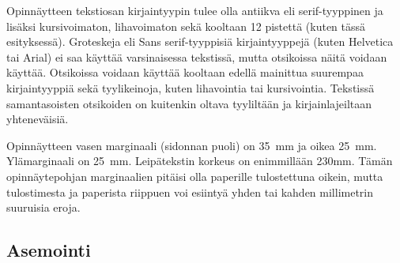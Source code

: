 \documentclass[english,12pt,a4paper,pdftex,sci,utf8]{aaltothesis}
\begin{document}
Opinn\"aytteen tekstiosan kirjaintyypin tulee olla antiikva eli
serif\--tyyp\-pi\-nen ja lis\"aksi kursivoimaton, lihavoimaton sek\"a kooltaan 12
pistett\"a (kuten t\"ass\"a esityksess\"a). Groteskeja eli \textsf{Sans
  serif}-tyyppisi\"a kirjaintyyppej\"a (kuten Helvetica tai Arial) ei saa
k\"aytt\"a\"a varsinaisessa tekstiss\"a, mutta otsikoissa n\"ait\"a voidaan
k\"aytt\"a\"a.  Otsikoissa voidaan k\"aytt\"a\"a kooltaan edell\"a mainittua
suurempaa kirjaintyyppi\"a sek\"a tyylikeinoja, kuten lihavointia tai
kursivointia.  Tekstiss\"a samantasoisten otsikoiden on kuitenkin oltava
tyylilt\"a\"an ja kirjainlajeiltaan yhtenev\"aisi\"a.
\begin{table}[htb]
\caption{Taulukoissa ja kuvissa kirjaintyypin voi valita
tarkoituksenmukaisesti, mutta kuva- ja taulukkoteksteiss\"a tulee
k\"aytt\"a\"a samaa kirjaintyyppi\"a kuin varsinaisessa tekstiss\"a.
Huomaa taulukon numeroinnin sijoittuminen taulukon yl\"apuolelle. \label{taulukko1}}
\begin{center}
\end{center}
\end{table}

Opinn\"aytteen vasen marginaali (sidonnan puoli) on
35~mm %
ja oikea 25~mm. Yl\"amarginaali on 25~mm. Leip\"atekstin korkeus on
enimmill\"a\"an 230mm. T\"am\"an opinn\"aytepohjan marginaalien pit\"aisi olla
paperille tulostettuna oikein, mutta tulostimesta ja paperista
riippuen voi esiinty\"a yhden tai kahden millimetrin suuruisia eroja.
\subsection*{Asemointi}
\end{document}
